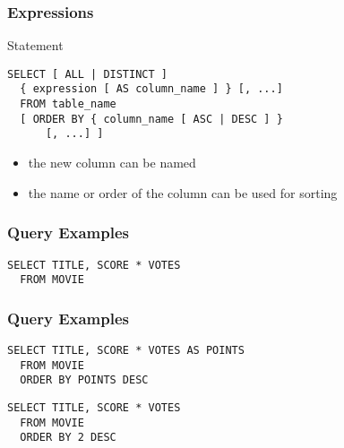 \documentclass[dvipsnames]{beamer}
\theoremstyle{plain}
\begin{document}
\begin{frame}[fragile]
  \frametitle{Expressions}

  \begin{block}{Statement}
    \begin{lstlisting}
SELECT [ ALL | DISTINCT ]
  { expression [ AS column_name ] } [, ...]
  FROM table_name
  [ ORDER BY { column_name [ ASC | DESC ] }
      [, ...] ]
    \end{lstlisting}
  \end{block}

  \pause
  \begin{itemize}
    \item the new column can be named
    \item the name or order of the column can be used for sorting
  \end{itemize}
\end{frame}

\begin{frame}[fragile]
  \frametitle{Query Examples}

  \begin{example}
    \begin{lstlisting}
SELECT TITLE, SCORE * VOTES
  FROM MOVIE
    \end{lstlisting}
  \end{example}
\end{frame}

\begin{frame}[fragile]
  \frametitle{Query Examples}

  \begin{example}
    \begin{lstlisting}
SELECT TITLE, SCORE * VOTES AS POINTS
  FROM MOVIE
  ORDER BY POINTS DESC
    \end{lstlisting}

    \pause
    \begin{lstlisting}
SELECT TITLE, SCORE * VOTES
  FROM MOVIE
  ORDER BY 2 DESC
    \end{lstlisting}
  \end{example}
\end{frame}
\end{document}
